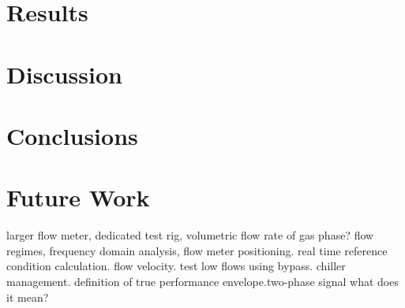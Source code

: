 \documentclass{report}
\begin{document}
\chapter{Results}

\chapter{Discussion}
\cite{Cheng2008111}
\cite{Cheng2009111}
\cite{Cheng2007111}
\chapter{Conclusions}
\chapter{Future Work}
larger flow meter, dedicated test rig, volumetric flow rate of gas phase? flow regimes, frequency domain analysis, flow meter positioning. real time reference condition calculation. flow velocity. test low flows using bypass. chiller management. definition of true performance envelope.two-phase signal what does it mean?


\iffalse
\end{document}
